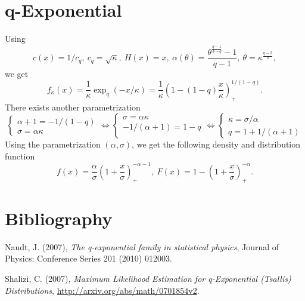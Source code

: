 \documentclass[11pt]{article}
\newcommand{\systL}{\left\{\begin{array}{l}}
\newcommand{\systR}{\end{array}\right.}
\begin{document}
\section{q-Exponential}
Using 
$$
c(x) = 1/c_q, ~
c_q = \sqrt \kappa,~
H(x)=x,~
\alpha(\theta) = \frac{\theta^{\frac{q-1}{3-q}}-1}{q-1},~
\theta=\kappa^{\frac{q-3}{2}},
$$
we get
$$
f_\kappa(x) 
= \frac{1}{ \kappa}\exp_q(-x/\kappa)
= \frac{1}{ \kappa}\left(1-(1-q) \frac{x}{\kappa}\right)_+^{1/(1-q)}.
$$
There exists another parametrization 
$$
\systL
\alpha+1 = -1/(1-q) \\ %
\sigma = \alpha\kappa 
\systR
\Leftrightarrow
\systL
\sigma = \alpha\kappa \\
-1/(\alpha+1) = 1-q \\ 
\systR
\Leftrightarrow
\systL
\kappa = \sigma/\alpha \\
q = 1 + 1/(\alpha+1)
\systR
$$
Using the parametrization $(\alpha,\sigma)$, we get the following density and distribution function
$$
f(x) = \frac{\alpha}{ \sigma}\left(1+ \frac{x}{\sigma}\right)_+^{-\alpha-1},~
F(x) = 1- \left(1+ \frac{x}{\sigma}\right)_+^{-\alpha} .
$$




\section{Bibliography}

\noindent
Naudt, J. (2007),
{\it The q-exponential family in statistical physics}, 
Journal of Physics: Conference Series 201 (2010) 012003.

\noindent
Shalizi, C. (2007),
{\it Maximum Likelihood Estimation for q-Exponential (Tsallis) Distributions}, 
\url{http://arxiv.org/abs/math/0701854v2}.
\end{document}

